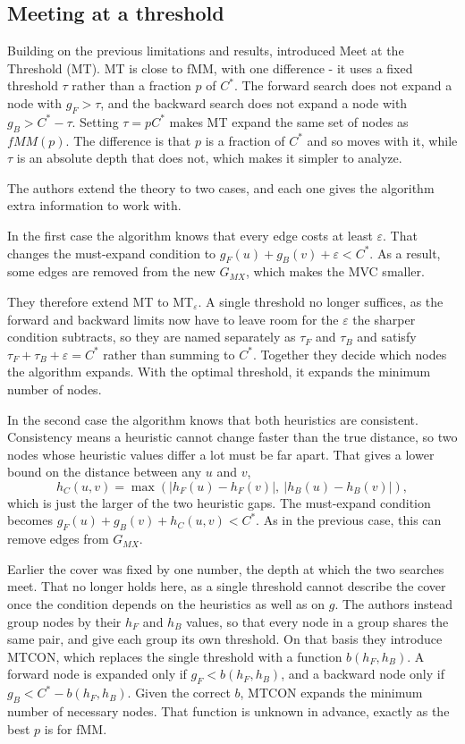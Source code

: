 \documentclass[letterpaper]{article} %
\begin{document}
\subsection{Meeting at a threshold}
Building on the previous limitations and results, \citet{shaham2018consistent} introduced Meet at the Threshold (MT). MT is close to fMM, with one difference - it uses a fixed threshold $\tau$ rather than a fraction $p$ of $C^*$. The forward search does not expand a node with $g_F > \tau$, and the backward search does not expand a node with $g_B > C^* - \tau$. Setting $\tau = pC^*$ makes MT expand the same set of nodes as $fMM(p)$. The difference is that $p$ is a fraction of $C^*$ and so moves with it, while $\tau$ is an absolute depth that does not, which makes it simpler to analyze.

The authors extend the theory to two cases, and each one gives the algorithm extra information to work with.

In the first case the algorithm knows that every edge costs at least $\varepsilon$. That changes the must-expand condition to $g_F(u) + g_B(v) + \varepsilon < C^*$. As a result, some edges are removed from the new $G_{MX}$, which makes the MVC smaller.

They therefore extend MT to MT$_\varepsilon$. A single threshold no longer suffices, as the forward and backward limits now have to leave room for the $\varepsilon$ the sharper condition subtracts, so they are named separately as $\tau_F$ and $\tau_B$ and satisfy $\tau_F + \tau_B + \varepsilon = C^*$ rather than summing to $C^*$. Together they decide which nodes the algorithm expands. With the optimal threshold, it expands the minimum number of nodes.

In the second case the algorithm knows that both heuristics are consistent. Consistency means a heuristic cannot change faster than the true distance, so two nodes whose heuristic values differ a lot must be far apart. That gives a lower bound on the distance between any $u$ and $v$, \[h_C(u,v)=\max\left(|h_F(u)-h_F(v)|,\ |h_B(u)-h_B(v)|\right),\] which is just the larger of the two heuristic gaps. The must-expand condition becomes $g_F(u) + g_B(v) + h_C(u,v) < C^*$. As in the previous case, this can remove edges from $G_{MX}$.

Earlier the cover was fixed by one number, the depth at which the two searches meet. That no longer holds here, as a single threshold cannot describe the cover once the condition depends on the heuristics as well as on $g$. The authors instead group nodes by their $h_F$ and $h_B$ values, so that every node in a group shares the same pair, and give each group its own threshold. On that basis they introduce MTCON, which replaces the single threshold with a function $b(h_F,h_B)$. A forward node is expanded only if $g_F < b(h_F,h_B)$, and a backward node only if $g_B < C^* - b(h_F,h_B)$. Given the correct $b$, MTCON expands the minimum number of necessary nodes. That function is unknown in advance, exactly as the best $p$ is for fMM.
\end{document}
